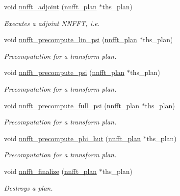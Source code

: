 \begin{CompactItemize}
void \hyperlink{group__nnfft_gd4f536f3aee7e85acc75c5fcad307b7d}{nnfft\_\-adjoint} (\hyperlink{structnnfft__plan}{nnfft\_\-plan} $\ast$ths\_\-plan)
\begin{CompactList}\small\item\em Executes a adjoint NNFFT, i.e. \item\end{CompactList}\item 
void \hyperlink{group__nnfft_g65983eef73b9f5740214bf720f62fcd6}{nnfft\_\-precompute\_\-lin\_\-psi} (\hyperlink{structnnfft__plan}{nnfft\_\-plan} $\ast$ths\_\-plan)
\begin{CompactList}\small\item\em Precomputation for a transform plan. \item\end{CompactList}\item 
void \hyperlink{group__nnfft_g962d6f449cbad4faf81e20328a911c46}{nnfft\_\-precompute\_\-psi} (\hyperlink{structnnfft__plan}{nnfft\_\-plan} $\ast$ths\_\-plan)
\begin{CompactList}\small\item\em Precomputation for a transform plan. \item\end{CompactList}\item 
void \hyperlink{group__nnfft_g78cf7bac65f6de46182ea1ff509c2af9}{nnfft\_\-precompute\_\-full\_\-psi} (\hyperlink{structnnfft__plan}{nnfft\_\-plan} $\ast$ths\_\-plan)
\begin{CompactList}\small\item\em Precomputation for a transform plan. \item\end{CompactList}\item 
void \hyperlink{group__nnfft_g9e4663c2cdbff65da327400657528580}{nnfft\_\-precompute\_\-phi\_\-hut} (\hyperlink{structnnfft__plan}{nnfft\_\-plan} $\ast$ths\_\-plan)
\begin{CompactList}\small\item\em Precomputation for a transform plan. \item\end{CompactList}\item 
void \hyperlink{group__nnfft_g9b5bcde6c436f8fe0e8d8dc4fa7a4230}{nnfft\_\-finalize} (\hyperlink{structnnfft__plan}{nnfft\_\-plan} $\ast$ths\_\-plan)
\begin{CompactList}\small\item\em Destroys a plan. \item\end{CompactList}\end{CompactItemize}


